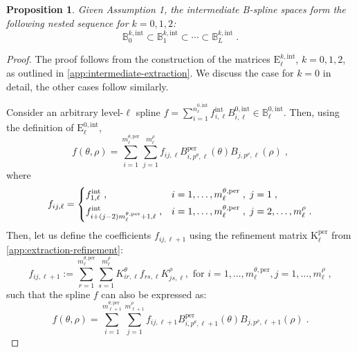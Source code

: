 \documentclass[10pt]{article}
\newcommand{\mbf}[1]{{\boldsymbol{#1}}}
\newcommand{\vSpace}[1]{\mathbb{#1}}
\newcommand{\mat}[1]{\mbf{\mathrm{#1}}}
\newcommand{\cU}{\theta}
\newcommand{\cV}{\rho}
\newcommand{\degU}{p^\cU}
\newcommand{\degV}{p^\cV}
\newcommand{\ndofV}{m^\cV}
\newcommand{\bsp}{B}
\newcommand{\bspS}{\vSpace{\bsp}}
\newcommand{\per}{\mathrm{per}}
\newcommand{\pndofU}{m^{\cU,\per}}
\newcommand{\tint}{\mathrm{int}}
\theoremstyle{plain}
\newtheorem{proposition}{Proposition}[section]
\theoremstyle{definition}
\theoremstyle{remark}
\begin{document}
\begin{proposition}
    Given Assumption 1, the intermediate B-spline spaces form the following nested sequence for $k = 0, 1, 2$:
    \begin{equation}
        \bspS^{k,\tint}_0 \subset \bspS^{k,\tint}_1 \subset \cdots \subset \bspS^{k,\tint}_L\;.
    \end{equation}
\end{proposition}
\begin{proof}
    The proof follows from the construction of the matrices $\mat{E}^{k,\tint}_\ell$, $k = 0, 1, 2$, as outlined in \cref{app:intermediate-extraction}.
    We discuss the case for $k = 0$ in detail, the other cases follow similarly.

	Consider an arbitrary level-$\ell$ spline $f = \sum_{i=1}^{n^{0,\tint}_\ell} f_{i,\ell}^\tint \bsp^{0,\tint}_{i,\ell} \in \bspS^{0,\tint}_\ell$.
    Then, using the definition of $\mat{E}^{0,\tint}_\ell$,
    \begin{equation*}
        f(\cU,\cV) = \sum\limits_{i=1}^{\pndofU_\ell}\sum_{j=1}^{\ndofV_\ell} f_{ij,\ell} \bsp^{\per}_{i,\degU,\ell}(\cU) \bsp_{j,\degV,\ell}(\cV)\;,
    \end{equation*}
    where
    \begin{equation*}
        f_{ij,\ell} = \begin{dcases}
            f^\tint_{1,\ell}\;, & i = 1, \dots, \pndofU_\ell\;,\;j = 1\;,\\
            f^\tint_{i + (j-2)\pndofU_\ell + 1,\ell}\;, & i = 1, \dots, \pndofU_\ell\;,\; j = 2, \dots, \ndofV_\ell\;.
        \end{dcases}
    \end{equation*}
    Then, let us define the coefficients $f_{ij,\ell+1}$ using the refinement matrix $\mat{K}^{\per}_\ell$ from \cref{app:extraction-refinement}:
    \begin{equation}\label{eq:two-scale-intermediate-1}
        f_{ij,\ell+1} :=
        \sum_{r=1}^{\pndofU_{\ell}}\sum_{s=1}^{\ndofV_{\ell}}K^{\cU}_{ir,\ell} f_{rs,\ell}K^{\cV}_{js,\ell} , \text{ for } i = 1, \dots, \pndofU_{\ell}, j = 1, \dots, \ndofV_\ell\;,
    \end{equation}
    such that the spline $f$ can also be expressed as:
    \begin{equation*}
        f(\cU,\cV) = \sum\limits_{i=1}^{\pndofU_{\ell+1}}\sum_{j=1}^{\ndofV_{\ell+1}} f_{ij,\ell+1} \bsp^{\per}_{i,\degU,\ell+1}(\cU) \bsp_{j,\degV,\ell+1}(\cV)\;.
    \end{equation*}

\end{proof}
\end{document}

